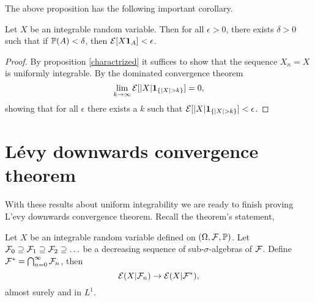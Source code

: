 The above proposition has the following important corollary.
\begin{corollary}
    Let $X$ be an integrable random variable. Then for all $\epsilon > 0$, there exists $\delta >0$ such that if ${\mathbb{P}}(A)<\delta$, then ${\mathcal{E}}[X{{\bf 1}}_A]<\epsilon$. 
\end{corollary}
\begin{proof}
    By proposition \eqref{charactrized} it suffices to show that the sequence $X_n=X$ is uniformly integrable. By the dominated convergence theorem
    \[\lim_{k \to \infty} {\mathcal{E}}[{\left\lvert X\right\rvert}{{\bf 1}}_{\{{\left\lvert X\right\rvert}>k\}}] = 0, \]
    showing that for all $\epsilon$ there exists a $k$ such that ${\mathcal{E}}[{\left\lvert X\right\rvert}{{\bf 1}}_{\{{\left\lvert X\right\rvert}>k\}}]<\epsilon$. 
\end{proof}
\section{L\'evy downwards convergence theorem}
With these results about uniform integrability we are ready to finish proving L'evy downwards convergence theorem. Recall the theorem's statement,
\begin{theorem}
    Let $X$ be an integrable random variable defined on $({{\Omega}},{\mathcal{F}},{\mathbb{P}})$. Let ${\mathcal{F}}_0 \supseteq {\mathcal{F}}_1 \supseteq {\mathcal{F}}_2 \supseteq \ldots$ be a decreasing sequence of sub-$\sigma$-algebras of ${\mathcal{F}}$. Define ${\mathcal{F}}^* = \bigcap_{n=0}^\infty {\mathcal{F}}_n$, then 
    \[{\mathcal{E}}(X|{\mathcal{F}}_n) \to {\mathcal{E}}(X|{\mathcal{F}}^*), \]
    almost surely and in $L^1$.
\end{theorem}
